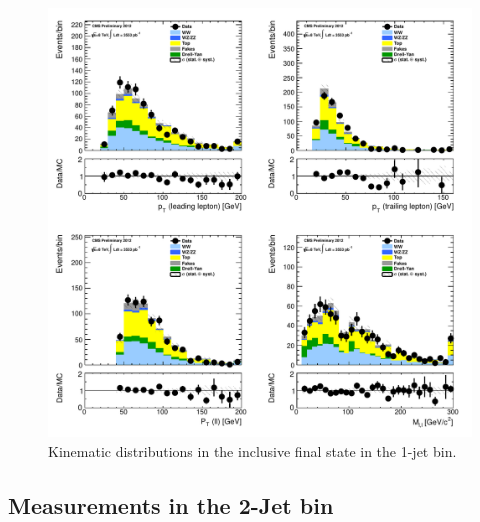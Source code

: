\begin{figure}[!hbtp]
\centering
\includegraphics[width=1\textwidth]{figures/ww_analysis20_0_ALL_incl_1j.pdf} %
\caption{Kinematic distributions in the inclusive final state in the 1-jet bin.}
\label{fig:xs_kinematics_incl_1j}
\end{figure}

\clearpage
\subsection{Measurements in the 2-Jet bin}

